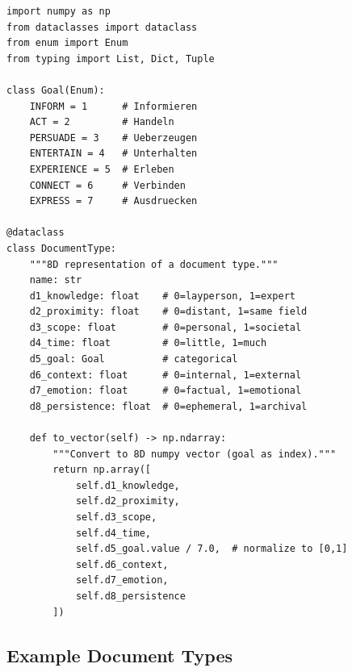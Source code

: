 \begin{verbatim}
import numpy as np
from dataclasses import dataclass
from enum import Enum
from typing import List, Dict, Tuple

class Goal(Enum):
    INFORM = 1      # Informieren
    ACT = 2         # Handeln
    PERSUADE = 3    # Ueberzeugen
    ENTERTAIN = 4   # Unterhalten
    EXPERIENCE = 5  # Erleben
    CONNECT = 6     # Verbinden
    EXPRESS = 7     # Ausdruecken

@dataclass
class DocumentType:
    """8D representation of a document type."""
    name: str
    d1_knowledge: float    # 0=layperson, 1=expert
    d2_proximity: float    # 0=distant, 1=same field
    d3_scope: float        # 0=personal, 1=societal
    d4_time: float         # 0=little, 1=much
    d5_goal: Goal          # categorical
    d6_context: float      # 0=internal, 1=external
    d7_emotion: float      # 0=factual, 1=emotional
    d8_persistence: float  # 0=ephemeral, 1=archival

    def to_vector(self) -> np.ndarray:
        """Convert to 8D numpy vector (goal as index)."""
        return np.array([
            self.d1_knowledge,
            self.d2_proximity,
            self.d3_scope,
            self.d4_time,
            self.d5_goal.value / 7.0,  # normalize to [0,1]
            self.d6_context,
            self.d7_emotion,
            self.d8_persistence
        ])
\end{verbatim}

\subsection{Example Document Types}

